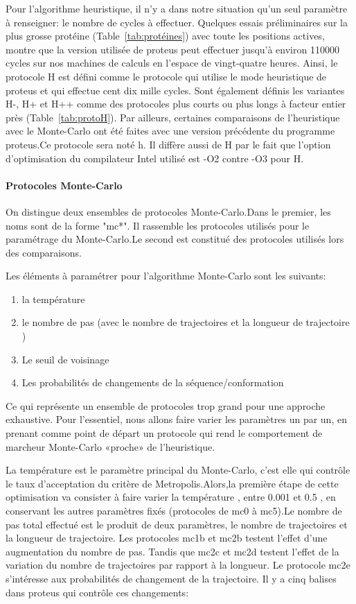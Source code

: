 Pour l'algorithme heuristique, il n'y a dans notre situation qu'un seul paramètre à renseigner: le nombre de cycles à effectuer. Quelques essais préliminaires sur la plus grosse protéine (Table~\ref{tab:protéines}) avec toute les positions actives, montre que la version utilisée de proteus peut effectuer jusqu'à environ 110000 cycles sur nos machines de calculs en l'espace de vingt-quatre heures. Ainsi, le protocole H est défini comme le protocole qui utilise le mode heuristique de proteus et qui effectue cent dix mille cycles. Sont également définis les variantes H-, H+ et H++ comme des protocoles plus courts ou plus longs à facteur entier près (Table~\ref{tab:protoH}). Par ailleurs, certaines comparaisons de l'heuristique avec le Monte-Carlo ont été faites avec une version précédente du programme proteus.Ce protocole sera noté h. Il diffère aussi de H par le fait que l'option d'optimisation du compilateur Intel utilisé est -O2 contre -O3 pour H.    


   \paragraph{Protocoles Monte-Carlo}
\label{para:MC}
On distingue deux ensembles de protocoles Monte-Carlo.Dans le premier, les noms  sont de la forme "mc*". Il rassemble les protocoles utilisés pour le paramétrage du Monte-Carlo.Le second est constitué des protocoles utilisés lors des comparaisons.     

Les éléments à paramétrer pour l'algorithme Monte-Carlo sont les suivants:

\begin{enumerate}
\item la température
\item le nombre de pas (avec le nombre de trajectoires et la longueur de trajectoire )
\item Le seuil de voisinage
\item Les probabilités de changements de la séquence/conformation
\end{enumerate}

Ce qui représente un ensemble de protocoles trop grand pour une approche exhaustive. Pour l'essentiel, nous allons faire varier les paramètres un par un, en prenant comme point de départ un protocole qui rend le comportement de marcheur Monte-Carlo «proche» de l'heuristique.

La température est le paramètre principal du Monte-Carlo, c'est elle qui contrôle le taux d'acceptation du critère de Metropolis.Alors,la première étape de cette optimisation va consister à faire varier la température , entre 0.001 et 0.5 , en conservant les autres paramètres fixés (protocoles de mc0 à mc5).Le nombre de pas total effectué est le produit de deux paramètres, le nombre de trajectoires et la longueur de trajectoire. Les protocoles mc1b et mc2b testent l'effet d'une augmentation du nombre de pas. Tandis que mc2c et mc2d testent l'effet de la variation du nombre de trajectoires par rapport à la longueur.
Le protocole mc2e s'intéresse aux probabilités de changement de la trajectoire. Il y a cinq balises dans proteus qui contrôle ces changements:

